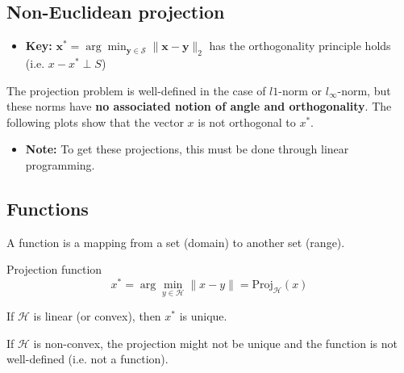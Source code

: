 \subsection{Non-Euclidean projection}
\begin{intuition}
    \begin{itemize}
        \item \textbf{Key:} $\mathbf{x}^* = \arg \min_{\mathbf{y} \in \mathcal{S}} \| \mathbf{x} - \mathbf{y} \|_2$ has the orthogonality principle holds (i.e. $x - x^{*} \perp S$)
    \end{itemize}
    \vspace{1em}

    The projection problem is well-defined in the case of $l1$-norm or $l_{\infty}$-norm, but these norms have \textbf{no associated notion of angle and orthogonality}. The following plots show that the vector $x$ is not orthogonal to $x^{*}$.
    \begin{itemize}
        \item \textbf{Note:} To get these projections, this must be done through linear programming. 
    \end{itemize}

\end{intuition}
        
\subsection{Functions}
\begin{definition}
    A function is a mapping from a set (domain) to another set (range).
\end{definition}

\begin{example}
    Projection function
    \[
    x^* = \arg\min_{y \in \mathcal{H}} \| x - y \| = \text{Proj}_{\mathcal{H}}(x)
    \]

    If $\mathcal{H}$ is linear (or convex), then $x^*$ is unique.


    If $\mathcal{H}$ is non-convex, the projection might not be unique and the function is not well-defined (i.e. not a function).

\end{example}


